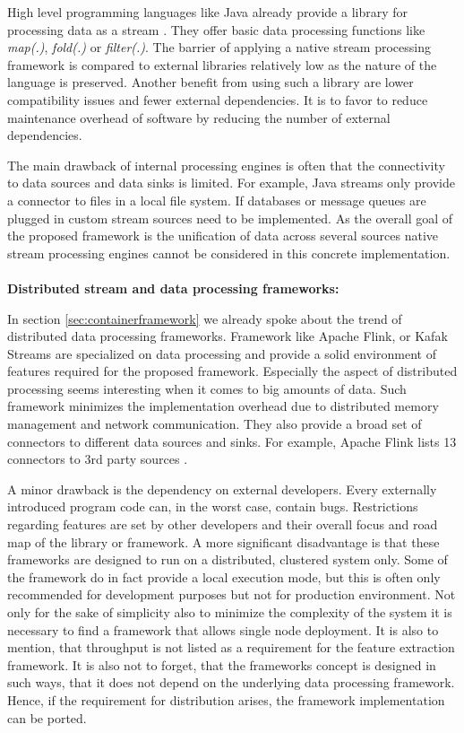 \noindent High level programming languages like Java already provide a library for processing data as a stream \cite{urma_2017}. They offer basic data processing functions like \textit{map(.)}, \textit{fold(.)} or \textit{filter(.)}. The barrier of applying a native stream processing framework is compared to external libraries relatively low as the nature of the language is preserved. Another benefit from using such a library are lower compatibility issues and fewer external dependencies. It is to favor to reduce maintenance overhead of software by reducing the number of external dependencies. 

The main drawback of internal processing engines is often that the connectivity to data sources and data sinks is limited. For example, Java streams only provide a connector to files in a local file system. If databases or message queues are plugged in custom stream sources need to be implemented. As the overall goal of the proposed framework is the unification of data across several sources native stream processing engines cannot be considered in this concrete implementation.
\\\\
\textbf{Distributed stream and data processing frameworks:}

\noindent In section \ref{sec:containerframework} we already spoke about the trend of distributed data processing frameworks. Framework like Apache Flink, or Kafak Streams are specialized on data processing and provide a solid environment of features required for the proposed framework. Especially the aspect of distributed processing seems interesting when it comes to big amounts of data. Such framework minimizes the implementation overhead due to distributed memory management and network communication. They also provide a broad set of connectors to different data sources and sinks. For example, Apache Flink lists 13 connectors to 3rd party sources \cite{flink_streaming_2017}. 

A minor drawback is the dependency on external developers. Every externally introduced program code can, in the worst case, contain bugs. Restrictions regarding features are set by other developers and their overall focus and road map of the library or framework. A more significant disadvantage is that these frameworks are designed to run on a distributed, clustered system only. Some of the framework do in fact provide a local execution mode, but this is often only recommended for development purposes but not for production environment. Not only for the sake of simplicity also to minimize the complexity of the system it is necessary to find a framework that allows single node deployment. It is also to mention, that throughput is not listed as a requirement for the feature extraction framework. It is also not to forget, that the frameworks concept is designed in such ways, that it does not depend on the underlying data processing framework. Hence, if the requirement for distribution arises, the framework implementation can be ported.
\\\\

